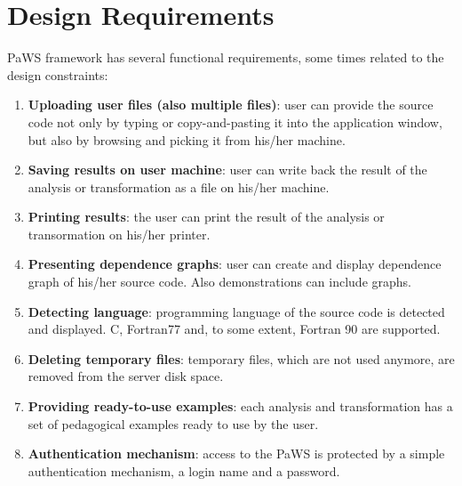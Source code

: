 \section{Design Requirements}
\label{design_requirements}

PaWS framework has several functional requirements, some times related
to the design constraints:

\begin{enumerate}

  \item {\bf Uploading user files (also multiple
      files)}\label{req:uploading_files}: user can provide the source
    code not only by typing or copy-and-pasting it into the
    application window, but also by browsing and picking it from
    his/her machine.

  \item {\bf Saving results on user
      machine}\label{req:saving_results}: user can write back the
    result of the analysis or transformation as a file on his/her
    machine.

  \item {\bf Printing results}\label{req:printing_results}: the user can
    print the result of the analysis or transormation on his/her
    printer.

  \item {\bf Presenting dependence
      graphs}\label{req:dependence_graphs}: user can create and
    display dependence graph of his/her source code. Also
    demonstrations can include graphs.

  \item {\bf Detecting language}\label{req:language_detection}:
    programming language of the source code is detected and
    displayed. C, Fortran77 and, to some extent, Fortran 90 are supported.

  \item {\bf Deleting temporary files}\label{req:deleting_files}:
    temporary files, which are not used anymore, are removed from the
    server disk space.

  \item {\bf Providing ready-to-use examples}\label{req:providing_examples}:
    each analysis and transformation has a set of pedagogical
    examples ready to use by the user.

  \item {\bf Authentication mechanism}\label{req:authentication}:
    access to the PaWS is protected by a simple authentication
    mechanism, a login name and a password.

\end{enumerate}
